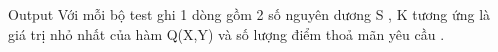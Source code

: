 Output
Với mỗi bộ test ghi 1 dòng gồm 2 số nguyên dương S , K tương ứng là giá trị nhỏ nhất của hàm Q(X,Y) và số lượng điểm thoả mãn yêu cầu .   
\\